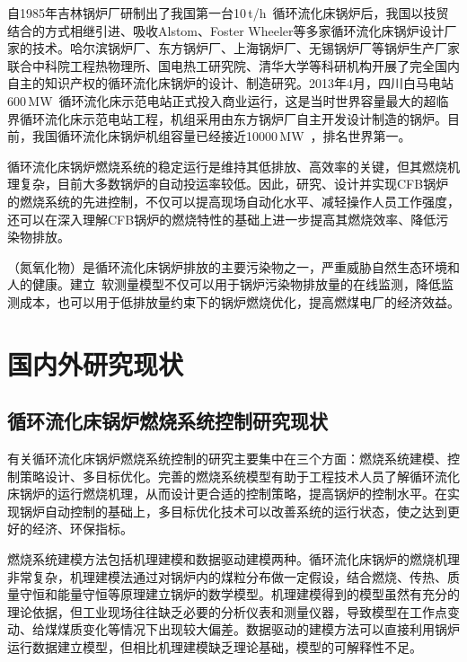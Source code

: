 自1985年吉林锅炉厂研制出了我国第一台10$\,$\si[per-mode=symbol]{\tonne\per\hour}~循环流化床锅炉后，我国以技贸结合的方式相继引进、吸收Alstom、Foster Wheeler等多家循环流化床锅炉设计厂家的技术\cite{周一工2009}。哈尔滨锅炉厂、东方锅炉厂、上海锅炉厂、无锡锅炉厂等锅炉生产厂家联合中科院工程热物理所、国电热工研究院、清华大学等科研机构开展了完全国内自主的知识产权的循环流化床锅炉的设计、制造研究。2013年4月，四川白马电站600$\,$\si{\mega\watt}~循环流化床示范电站正式投入商业运行，这是当时世界容量最大的超临界循环流化床示范电站工程，机组采用由东方锅炉厂自主开发设计制造的锅炉。目前，我国循环流化床锅炉机组容量已经接近10000$\,$\si{\mega\watt}~，排名世界第一\cite{岳光溪2016}。

循环流化床锅炉燃烧系统的稳定运行是维持其低排放、高效率的关键，但其燃烧机理复杂，目前大多数锅炉的自动投运率较低。因此，研究、设计并实现CFB锅炉的燃烧系统的先进控制，不仅可以提高现场自动化水平、减轻操作人员工作强度，还可以在深入理解CFB锅炉的燃烧特性的基础上进一步提高其燃烧效率、降低污染物排放。

（氮氧化物）是循环流化床锅炉排放的主要污染物之一，严重威胁自然生态环境和人的健康。建立~软测量模型不仅可以用于锅炉污染物排放量的在线监测，降低监测成本，也可以用于低排放量约束下的锅炉燃烧优化，提高燃煤电厂的经济效益。


\section{国内外研究现状}

\subsection{循环流化床锅炉燃烧系统控制研究现状}

有关循环流化床锅炉燃烧系统控制的研究主要集中在三个方面：燃烧系统建模、控制策略设计、多目标优化。完善的燃烧系统模型有助于工程技术人员了解循环流化床锅炉的运行燃烧机理，从而设计更合适的控制策略，提高锅炉的控制水平。在实现锅炉自动控制的基础上，多目标优化技术可以改善系统的运行状态，使之达到更好的经济、环保指标。

燃烧系统建模方法包括机理建模和数据驱动建模两种。循环流化床锅炉的燃烧机理非常复杂，机理建模法通过对锅炉内的煤粒分布做一定假设，结合燃烧、传热、质量守恒和能量守恒等原理建立锅炉的数学模型。机理建模得到的模型虽然有充分的理论依据，但工业现场往往缺乏必要的分析仪表和测量仪器，导致模型在工作点变动、给煤煤质变化等情况下出现较大偏差。数据驱动的建模方法可以直接利用锅炉运行数据建立模型，但相比机理建模缺乏理论基础，模型的可解释性不足。

